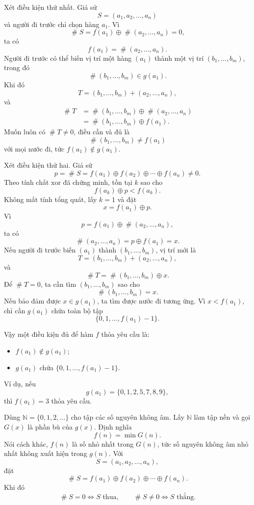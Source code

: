 \documentclass[11pt]{article}
\newcommand{\nimadd}{\oplus}
\newcommand{\val}[1]{\mathop{\#}\!#1}
\newcommand{\Nat}{\mathbb{N}}
\begin{document}
Xét điều kiện thứ nhất. Giả sử
\[
  S=(a_1,a_2,\ldots,a_n)
\]
và người đi trước chỉ chọn hàng \(a_1\). Vì
\[
  \val{S}=f(a_1)\nimadd\val{(a_2,\ldots,a_n)}=0,
\]
ta có
\[
  f(a_1)=\val{(a_2,\ldots,a_n)}.
\]
Người đi trước có thể biến vị trí một hàng \((a_1)\) thành một vị trí
\((b_1,\ldots,b_m)\), trong đó
\[
  \val{(b_1,\ldots,b_m)}\in g(a_1).
\]
Khi đó
\[
  T=(b_1,\ldots,b_m)+(a_2,\ldots,a_n),
\]
và
\[
\begin{aligned}
  \val{T}
  &=\val{(b_1,\ldots,b_m)}\nimadd\val{(a_2,\ldots,a_n)}\\
  &=\val{(b_1,\ldots,b_m)}\nimadd f(a_1).
\end{aligned}
\]
Muốn luôn có \(\val{T}\ne0\), điều cần và đủ là
\[
  \val{(b_1,\ldots,b_m)}\ne f(a_1)
\]
với mọi nước đi, tức \(f(a_1)\notin g(a_1)\).

Xét điều kiện thứ hai. Giả sử
\[
  p=\val{S}=f(a_1)\nimadd f(a_2)\nimadd\cdots\nimadd f(a_n)\ne0.
\]
Theo tính chất xor đã chứng minh, tồn tại \(k\) sao cho
\[
  f(a_k)\nimadd p<f(a_k).
\]
Không mất tính tổng quát, lấy \(k=1\) và đặt
\[
  x=f(a_1)\nimadd p.
\]
Vì
\[
  p=f(a_1)\nimadd\val{(a_2,\ldots,a_n)},
\]
ta có
\[
  \val{(a_2,\ldots,a_n)}=p\nimadd f(a_1)=x.
\]
Nếu người đi trước biến \((a_1)\) thành \((b_1,\ldots,b_m)\), vị trí mới là
\[
  T=(b_1,\ldots,b_m)+(a_2,\ldots,a_n),
\]
và
\[
  \val{T}=\val{(b_1,\ldots,b_m)}\nimadd x.
\]
Để \(\val{T}=0\), ta cần tìm \((b_1,\ldots,b_m)\) sao cho
\[
  \val{(b_1,\ldots,b_m)}=x.
\]
Nếu bảo đảm được \(x\in g(a_1)\), ta tìm được nước đi tương ứng. Vì
\(x<f(a_1)\), chỉ cần \(g(a_1)\) chứa toàn bộ tập
\[
  \{0,1,\ldots,f(a_1)-1\}.
\]

Vậy một điều kiện đủ để hàm \(f\) thỏa yêu cầu là:
\begin{itemize}
  \item \(f(a_1)\notin g(a_1)\);
  \item \(g(a_1)\) chứa \(\{0,1,\ldots,f(a_1)-1\}\).
\end{itemize}
Ví dụ, nếu
\[
  g(a_1)=\{0,1,2,5,7,8,9\},
\]
thì \(f(a_1)=3\) thỏa yêu cầu.

Dùng \(\Nat=\{0,1,2,\ldots\}\) cho tập các số nguyên không âm. Lấy \(\Nat\)
làm tập nền và gọi \(G(x)\) là phần bù của \(g(x)\). Định nghĩa
\[
  f(n)=\min G(n).
\]
Nói cách khác, \(f(n)\) là số nhỏ nhất trong \(G(n)\), tức số nguyên không âm
nhỏ nhất không xuất hiện trong \(g(n)\). Với
\[
  S=(a_1,a_2,\ldots,a_n),
\]
đặt
\[
  \val{S}=f(a_1)\nimadd f(a_2)\nimadd\cdots\nimadd f(a_n).
\]
Khi đó
\[
  \val{S}=0 \Longleftrightarrow S\text{ thua},\qquad
  \val{S}\ne0 \Longleftrightarrow S\text{ thắng}.
\]
\end{document}
